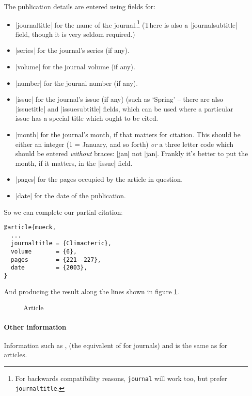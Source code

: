{The publication details are entered using fields for:
\begin{itemize}
\item |journaltitle| for the name of the journal.\footnote{For
    backwards compatibility reasons, \texttt{journal} will work too,
    but prefer \texttt{journaltitle}.} (There is also a
  |journalsubtitle| field, though it is very seldom required.)
\item |series| for the journal's series (if any).
\item |volume| for the journal volume (if any).
\item |number| for the journal number (if any).
\item |issue| for the journal's issue (if any) (such as `Spring' --
  there are also |issuetitle| and |issuesubtitle| fields, which can be
  used where a particular issue has a special title which ought to be
  cited.
\item |month| for the journal's month, if that matters for
  citation. This should be either an integer (1 = January, and so
  forth) \emph{or} a three letter code which should be entered
  \emph{without} braces: |jan| not |{jan}|. Frankly it's better to put
  the month, if it matters, in the |issue| field.
\item |pages| for the pages occupied by the article in question.
\item |date| for the date of the publication.
\end{itemize}

So we can complete our partial citation:
\begin{Verbatim}
@article{mueck,
  ...
  journaltitle = {Climacteric},
  volume       = {6},
  pages        = {221--227},
  date         = {2003},
}
\end{Verbatim}

And producing the result along the lines shown in figure \ref{mueck2}.

\begin{figure}
  \caption{Article\label{mueck2}}
\end{figure} 

\paragraph{Other information} Information such as ,
 (the equivalent of  for journals) and
 is the same as for articles.

}
